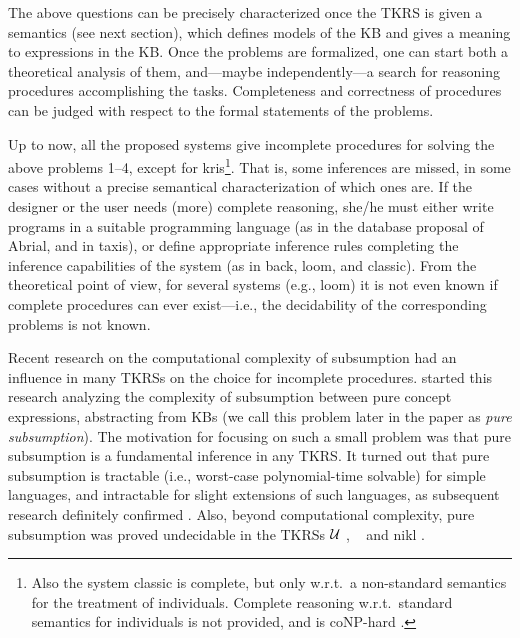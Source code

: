The above questions can be precisely characterized once the TKRS
is given a semantics (see next section), which defines models of the KB and gives
a meaning to expressions in the KB. Once the
problems are formalized, one can start both a theoretical analysis of them,
and---maybe independently---a search for reasoning procedures accomplishing the
tasks.
Completeness and correctness of procedures can be judged with respect to
the formal statements of the problems. 

Up to now, all the proposed systems give incomplete procedures for solving 
the above problems 1--4, except for {\sc kris}\footnote{Also the system {\sc
classic} is complete, but only w.r.t.\ a non-standard semantics
for the treatment of individuals. Complete reasoning w.r.t.\ standard semantics
for individuals is not provided, and is coNP-hard \cite{LeSc91}.}. That is, some
inferences are missed, in some cases without a precise semantical
characterization of which ones are. If the designer or the user needs (more)
complete reasoning, she/he must either write programs in a suitable programming
language (as in the database proposal of Abrial, and in {\sc taxis}), or define
appropriate inference rules completing the inference capabilities of the system 
(as in {\sc back}, {\sc loom}, and {\sc classic}). From the theoretical point of
view, for several systems (e.g., {\sc loom}) it is not even known if complete
procedures can ever exist---i.e., the decidability of the corresponding problems
is not known.

Recent research on the computational complexity of subsumption had an influence
in many TKRSs on the choice for incomplete procedures.  started
this research analyzing the  complexity of subsumption between pure
concept expressions, abstracting from KBs (we call this problem later in the
paper as {\em pure subsumption}). The motivation for focusing on such a small
problem was that pure subsumption is a fundamental inference in any TKRS. It
turned out that pure subsumption is tractable (i.e., worst-case polynomial-time
solvable) for simple languages, and intractable for slight extensions of such languages, as subsequent research
definitely confirmed  \cite{Nebe88,DLNN91,DLNN91b,ScSm91,DHLM92}. Also, beyond
computational complexity, pure subsumption was proved undecidable in the TKRSs
${\cal U}$ \cite{Schi88}, \KLONE\ \cite{Schm89} and {\sc nikl} \cite{Pate89b}.  

